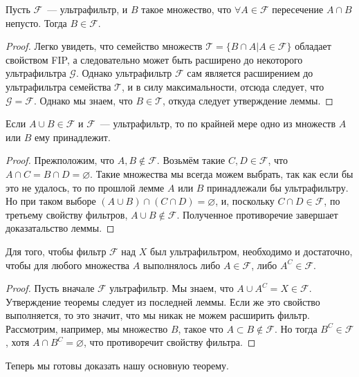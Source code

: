 \begin{lemma}
Пусть $\mathcal{F}$~--- ультрафильтр, и $B$ такое множество, что $\forall A\in\mathcal{F}$ пересечение $A\cap B$ непусто. Тогда $B\in\mathcal{F}$.
\end{lemma}
\begin{proof}
Легко увидеть, что семейство множеств $\mathcal{T} = \{B\cap A| A\in\mathcal{F}\}$ обладает свойством FIP, а следовательно может быть расширено до некоторого ультрафильтра $\mathcal{G}$. Однако ультрафильтр $\mathcal{F}$ сам является расширением до ультрафильтра семейства $\mathcal{T}$, и в силу максимальности, отсюда следует, что $\mathcal{G} = \mathcal{F}$. Однако мы знаем, что $B\in\mathcal{T}$, откуда следует утверждение леммы.
\end{proof}

\begin{lemma}
Если $A\cup B\in\mathcal{F}$ и $\mathcal{F}$~--- ультрафильтр, то по крайней мере одно из множеств $A$ или $B$ ему принадлежит.
\end{lemma}
\begin{proof}
Прежположим, что $A,B\not\in\mathcal{F}$. Возьмём такие $C, D\in\mathcal{F}$, что $A\cap C = B\cap D = \varnothing$. Такие множества мы всегда можем выбрать, так как если бы это не удалось, то по прошлой лемме $A$ или $B$ принадлежали бы ультрафильтру. Но при таком выборе $(A\cup B)\cap(C\cap D) = \varnothing$, и, поскольку $C\cap D\in\mathcal{F}$, по третьему свойству фильтров, $A\cup B \not\in \mathcal{F}$. Полученное противоречие завершает доказатальство леммы.
\end{proof}

\begin{thm}
Для того, чтобы фильтр $\mathcal{F}$ над $X$ был ультрафильтром, необходимо и достаточно, чтобы для любого множества $A$ выполнялось либо $A\in\mathcal{F}$, либо $A^C\in\mathcal{F}$.
\end{thm}
\begin{proof}
Пусть вначале $\mathcal{F}$ ультрафильтр. Мы знаем, что $A\cup A^C = X \in\mathcal{F}$. Утверждение теоремы следует из последней леммы.
Если же это свойство выполняется, то это значит, что мы никак не можем расширить фильтр. Рассмотрим, например, мы множество $B$, такое что $A\subset B\not\in\mathcal{F}$. Но тогда $B^C\in\mathcal{F}$, хотя $A\cap B^C=\varnothing$, что противоречит свойству фильтра.
\end{proof}

Теперь мы готовы доказать нашу основную теорему.

